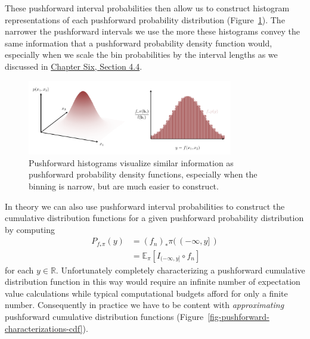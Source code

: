 \documentclass[
  letterpaper,
  DIV=11,
  numbers=noendperiod]{scrartcl}
\begin{document}
These pushforward interval probabilities then allow us to construct
histogram representations of each pushforward probability distribution
(Figure~\ref{fig-pushforward-characterizations-histogram}). The narrower
the pushforward intervals we use the more these histograms convey the
same information that a pushforward probability density function would,
especially when we scale the bin probabilities by the interval lengths
as we discussed in
\href{https://betanalpha.github.io/assets/chapters_html/density_functions.html\#lebesgue-probability-densities-as-limiting-interval-probabilities}{Chapter
Six, Section 4.4}.

\begin{figure}

{\centering \includegraphics[width=0.8\textwidth,height=\textheight]{figures/pushforward_characterizations/histogram/histogram.pdf}

}

\caption{\label{fig-pushforward-characterizations-histogram}Pushforward
histograms visualize similar information as pushforward probability
density functions, especially when the binning is narrow, but are much
easier to construct.}

\end{figure}

In theory we can also use pushforward interval probabilities to
construct the cumulative distribution functions for a given pushforward
probability distribution by computing \begin{align*}
P_{f_{*} \pi}(y)
&=
(f_{n})_{*} \pi( \, (-\infty, y] \, )
\\
&=
\mathbb{E}_{\pi} \left[ I_{(-\infty, y]} \circ f_{n} \right]
\end{align*} for each \(y \in \mathbb{R}\). Unfortunately completely
characterizing a pushforward cumulative distribution function in this
way would require an infinite number of expectation value calculations
while typical computational budgets afford for only a finite number.
Consequently in practice we have to be content with \emph{approximating}
pushforward cumulative distribution functions
(Figure~\ref{fig-pushforward-characterizations-cdf}).
\end{document}
